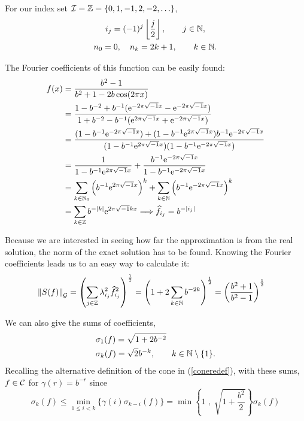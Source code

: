 \documentclass[final]{elsarticle}
\theoremstyle{definition}
\theoremstyle{remark}
\begin{document}
For our index set $\ci=\integers=\{0,1,-1,2,-2,\ldots\}$,
\begin{gather*}
i_j=(-1)^{j}\left\lfloor\frac{j}{2}\right\rfloor,\qquad j\in\naturals,\\
n_0=0,\quad n_k=2k+1, \qquad k\in\naturals.
\end{gather*}

The Fourier coefficients of this function can be easily found:
\begin{align*}
f(x)&=\frac{b^2-1}{b^2+1-2b\cos(2\pi x)}\\
&=\frac{1-b^{-2}+b^{-1}(\me^{-2\pi\sqrt{-1}x}-\me^{-2\pi\sqrt{-1}x})}{1+b^{-2}-b^{-1}(\me^{2\pi\sqrt{-1}x}+\me^{-2\pi\sqrt{-1}x})}\\
&=\frac{(1-b^{-1}\me^{-2\pi\sqrt{-1}x})+(1-b^{-1}\me^{2\pi\sqrt{-1}x})b^{-1}\me^{-2\pi\sqrt{-1}x}}{(1-b^{-1}\me^{2\pi\sqrt{-1}x})(1-b^{-1}\me^{-2\pi\sqrt{-1}x})}\\
&=\frac{1}{1-b^{-1}\me^{2\pi\sqrt{-1}x}}+\frac{b^{-1}\me^{-2\pi\sqrt{-1}x}}{1-b^{-1}\me^{-2\pi\sqrt{-1}x}}\\
&=\sum_{k\in\naturals_0}\left(b^{-1}\me^{2\pi\sqrt{-1}x}\right)^k+\sum_{k\in\naturals}\left(b^{-1}\me^{-2\pi\sqrt{-1}x}\right)^k\\
&=\sum_{k\in\integers}b^{-\abs{k}}\me^{2\pi\sqrt{-1}kx}\Longrightarrow\hf_{i_j}=b^{-\abs{i_j}}
\end{align*}

Because we are interested in seeing how far the approximation is from the real solution, the norm of the exact solution has to be found. Knowing the Fourier coefficients leads us to an easy way to calculate it:
\begin{align*}
\norm[\cg]{S(f)}&=\left(\sum_{j\in\integers}\lambda_{i_j}^2\hf_{i_j}^2\right)^{\frac{1}{2}} =\left(1+2\sum_{k\in\naturals}b^{-2k}\right)^{\frac{1}{2}}=\left(\frac{b^2+1}{b^2-1}\right)^{\frac{1}{2}}
\end{align*}

We can also give the sums of coefficients,
\begin{align*}
&\sigma_1(f)=\sqrt{1+2b^{-2}}\\
&\sigma_k(f)=\sqrt{2}b^{-k}, \qquad k \in\naturals\setminus\{1\}.
\end{align*}
Recalling the alternative definition of the cone in (\ref{coneredef}), with these sums, $f\in\cc$ for $\gamma(r)=b^{-r}$ since
\begin{equation*}
\sigma_k(f) \le \min_{1 \le i <k}\{\gamma(i)\sigma_{k-i}(f)\}=\min\left\{1 \; , \; \sqrt{1+\frac{b^2}{2}} \right\}\sigma_k(f)
\end{equation*}
\end{document}
